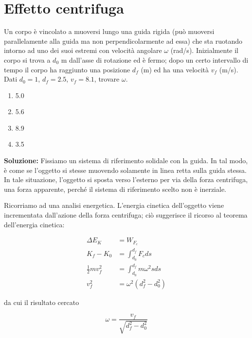 
\section{Effetto centrifuga}

Un corpo è vincolato a muoversi lungo una guida
rigida (può muoversi parallelamente alla guida
ma non perpendicolarmente ad essa) che sta
ruotando intorno ad uno dei suoi estremi con
velocità angolare $\omega$ (rad/s). Inizialmente
il corpo si trova a $d_0$ m dall'asse di rotazione
ed è fermo; dopo un certo intervallo di tempo
il corpo ha raggiunto una posizione $d_f$ (m)
ed ha una velocità $v_f$ (m/s). Dati
$d_0 = 1$, $d_f = 2.5$, $v_f = 8.1$, trovare
$\omega$.
\begin{enumerate}
    \item 5.0
    \item 5.6
    \item 8.9
    \item 3.5
\end{enumerate}

\noindent \textbf{Soluzione:}
Fissiamo un sistema di riferimento
solidale con la guida. In tal modo, è come se
l'oggetto si stesse muovendo solamente in linea
retta sulla guida stessa. In tale situazione,
l'oggetto si sposta verso l'esterno per via
della forza centrifuga, una forza apparente,
perché il sistema di riferimento scelto
non è inerziale.

Ricorriamo ad una analisi energetica. L'energia
cinetica dell'oggetto viene incrementata dall'azione
della forza centrifuga; ciò suggerisce il ricorso
al teorema dell'energia cinetica:

\begin{align}
    \Delta E_K &= W_{F_c}\label{g1}\\
    K_f - K_0 &= \int_{d_0}^{d_f}F_c ds\label{g2}\\
    \frac12 m v_f^2 &= \int_{d_0}^{d_f}m\omega^2sds\label{g3}\\
    v_f^2 &= \omega^2(d_f^2 - d_0^2)\label{g4}
\end{align}

\noindent da cui il risultato cercato

\[ \omega = \frac{v_f}{\sqrt{d_f^2 - d_0^2}} \]

